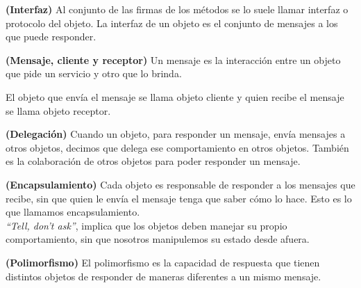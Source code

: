 \documentclass[../main.tex]{subfiles}
\begin{document}
        \begin{definition} \textbf{(Interfaz)}
            Al conjunto de las firmas de los métodos se lo suele llamar interfaz o protocolo del objeto. La interfaz de un objeto es el conjunto de mensajes a los que puede responder.
        \end{definition}

        \begin{definition} \textbf{(Mensaje, cliente y receptor)}
            Un mensaje es la interacción entre un objeto que pide un servicio y otro que lo brinda.

            El objeto que envía el mensaje se llama objeto cliente y quien recibe el mensaje se llama objeto receptor.
            
        \end{definition}

        \begin{definition} \textbf{(Delegación)}
            Cuando un objeto, para responder un mensaje, envía mensajes a otros objetos, decimos que delega ese comportamiento en otros objetos. También es la colaboración de otros objetos para poder responder un mensaje.
        \end{definition}

        \begin{definition} \textbf{(Encapsulamiento)}
            Cada objeto es responsable de responder a los mensajes que recibe, sin que quien le envía el mensaje tenga que saber cómo lo hace. Esto es lo que llamamos encapsulamiento.\\

            \textit{“Tell, don’t ask”}, implica que los objetos deben manejar su propio comportamiento, sin que nosotros manipulemos su estado desde afuera.
        \end{definition}

        \begin{definition} \textbf{(Polimorfismo)}
            El polimorfismo es la capacidad de respuesta que tienen distintos objetos de responder de maneras diferentes a un mismo mensaje.
        \end{definition}
\end{document}
